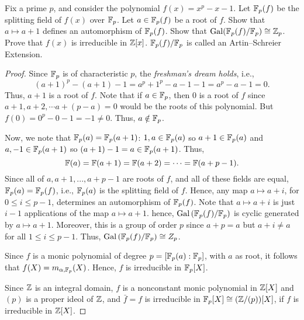 \begin{problem}
Fix a prime $p$, and consider the polynomial $f(x)=x^p-x-1$. Let
$\mathbb{F}_p(f)$ be the splitting field of $f(x)$ over $\mathbb{F}_p$. Let
$a\in\mathbb{F}_p(f)$ be a root of $f$. Show that $a\mapsto a+1$ defines an
automorphism of $\mathbb{F}_p(f)$. Show that
$\operatorname{Gal}(\mathbb{F}_p(f)/\mathbb{F}_p)\cong\mathbb{Z}_p$. Prove that $f(x)$ is irreducible in
$\mathbb{Z}[x]$. $\mathbb{F}_p(f)/\mathbb{F}_p$ is called an Artin--Schreier Extension.
\end{problem}
\begin{proof}
Since $\mathbb{F}_p$ is of characteristic $p$, the \emph{freshman's dream holds},
i.e.,
\[
(a+1)^p-(a+1)-1=a^p+1^p-a-1-1=a^p-a-1=0.
\]
Thus, $a+1$ is a root of $f$. Note that if $a\in\mathbb{F}_p$, then $0$ is a root
of $f$ since $a+1,a+2,\cdots a+(p-a)=0$ would be the roots of this
polynomial. But $f(0)=0^p-0-1=-1\neq 0$. Thus, $a\notin\mathbb{F}_p$.

Now, we note that $\mathbb{F}_p(a)=\mathbb{F}_p(a+1)$: $1,a\in\mathbb{F}_p(a)$ so
$a+1\in\mathbb{F}_p(a)$ and $a,-1\in\mathbb{F}_p(a+1)$ so
$(a+1)-1=a\in\mathbb{F}_p(a+1)$. Thus,
\[
\mathbb{F}(a)=\mathbb{F}(a+1)=\mathbb{F}(a+2)=\cdots=\mathbb{F}(a+p-1).
\]
Since all of $a,a+1,...,a+p-1$ are roots of $f$, and all of these fields
are equal, $\mathbb{F}_p(a)=\mathbb{F}_p(f)$, i.e., $\mathbb{F}_p(a)$ is the splitting field
of $f$. Hence, any map $a\mapsto a+i$, for $0\leq i\leq p-1$, determines an
automorphism of $\mathbb{F}_p(f)$. Note that $a\mapsto a+i$ is just $i-1$
applications of the map $a\mapsto a+1$. hence,
$\operatorname{Gal}\left(\mathbb{F}_p(f)/\mathbb{F}_p\right)$ is cyclic generated by $a\mapsto
a+1$. Moreover, this is a group of order $p$ since $a+p=a$ but $a+i\neq a$
for all $1\leq i\leq p-1$. Thus, $\operatorname{Gal}\left(\mathbb{F}_p(f)/\mathbb{F}_p\right)\cong
Z_p$.

Since $f$ is a monic polynomial of degree
$p=\left[\mathbb{F}_p(a):\mathbb{F}_p\right]$, with $a$ as root, it follows that
$f(X)=m_{\alpha,\mathbb{F}_p}(X)$. Hence, $f$ is irreducible in $\mathbb{F}_p[X]$.

Since $\mathbb{Z}$ is an integral domain, $f$ is a nonconstant monic polynomial
in $\mathbb{Z}[X]$ and $(p)$ is a proper ideol of $\mathbb{Z}$, and $\bar f=f$ is
irreducible in $\mathbb{F}_p[X]\cong(\mathbb{Z}/(p))[X]$, if $f$ is irreducible in
$\mathbb{Z}[X]$.
\end{proof}

